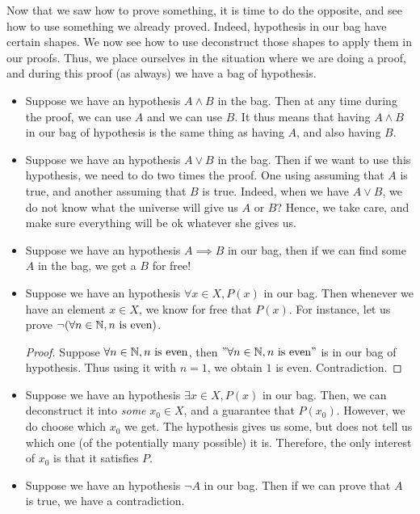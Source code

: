 Now that we saw how to prove something, it is time to do the opposite, and see how to use something we already proved. Indeed, hypothesis in our bag have certain shapes. We now see how to use deconstruct those shapes to apply them in our proofs. Thus, we place ourselves in the situation where we are doing a proof, and during this proof (as always) we have a bag of hypothesis.
\begin{itemize}
    \item Suppose we have an hypothesis \( A \land B \) in the bag. Then at any time during the proof, we can use \( A \) and we can use \( B \). It thus means that having \( A \land B \) in our bag of hypothesis is the same thing as having \( A \), and also having \( B \). 
    \item Suppose we have an hypothesis \( A \lor B \) in the bag. Then if we want to use this hypothesis, we need to do two times the proof. One using assuming that \( A \) is true, and another assuming that \( B \) is true. Indeed, when we have \( A \lor B \), we do not know what the universe will give us \( A \) or \( B \)? Hence, we take care, and make sure everything will be ok whatever she gives us.
    \item Suppose we have an hypothesis \( A \implies B \) in our bag, then if we can find some \( A \) in the bag, we get a \( B \) for free!  
    \item Suppose we have an hypothesis \( \forall x \in X, P(x) \) in our bag. Then whenever we have an element \( x \in X \), we know for free that \( P(x) \). For instance, let us prove \( \neg (\forall n \in \mathbb{N}, n\text{ is even}) \).
    \begin{proof}
        Suppose \( \forall n \in \mathbb{N}, n\text{ is even} \), then \( "\forall n \in \mathbb{N}, n\text{ is even}" \) is in our bag of hypothesis. Thus using it with \( n = 1 \), we obtain \( 1 \) is even. Contradiction.
    \end{proof}
    \item Suppose we have an hypothesis \( \exists x \in X, P(x) \) in our bag. Then, we can deconstruct it into \textit{some} \( x_0 \in X \), and a guarantee that \( P(x_0) \). However, we do  choose which \( x_0 \) we get. The hypothesis gives us some, but does not tell us which one (of the potentially many possible) it is. Therefore, the only interest of \( x_0 \) is that it satisfies \( P \).
    
    \item Suppose we have an hypothesis \( \neg A \) in our bag. Then if we can prove that \( A \) is true, we have a contradiction. 
    

\end{itemize}
